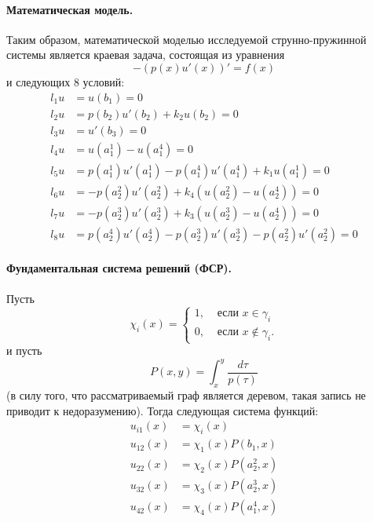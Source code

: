 \documentclass[a4paper,12pt]{article} %
\begin{document}
\paragraph{Математическая модель.}
Таким образом, математической моделью исследуемой струнно-пружинной системы является
краевая задача, состоящая из уравнения
\begin{equation}
	-(p(x)u'(x))' = f(x)
\end{equation}
и следующих 8 условий:
\begin{align}
	l_1 u & = u(b_1) = 0
	\\
	l_2 u & = p(b_2  ) u'(b_2  ) + k_2  u(b_2  ) = 0
	\\
	l_3 u & = u'(b_3) = 0
	\\
	l_4 u & = u(a_1^1) - u(a_1^4) = 0
	\\
	l_5 u & = p(a_1^1) u'(a_1^1) - p(a_1^4) u'(a_1^4) + k_1  u(a_1^1) = 0
	\\
	l_6 u & = - p(a_2^2) u'(a_2^2) + k_4 (u(a_2^2) - u(a_2^4)) = 0
	\\
	l_7 u & = - p(a_2^3) u'(a_2^3) + k_3 (u(a_2^3) - u(a_2^4)) = 0
	\\
	l_8 u & = p(a_2^4) u'(a_2^4) - p(a_2^3) u'(a_2^3) - p(a_2^2) u'(a_2^2) = 0
\end{align}

\paragraph{Фундаментальная система решений (ФСР).}
Пусть
\begin{equation}
	\chi_{i}(x) = \begin{cases}
		1, & \mbox{~если~} x \in \gamma_i
		\\
		0, & \mbox{~если~} x \notin \gamma_i.
	\end{cases}
\end{equation}
и пусть
\begin{equation}
	P(x,y) = \int_x^y \frac{d\tau}{p(\tau)}
\end{equation}
(в силу того, что рассматриваемый граф является деревом, такая запись не приводит к недоразумению).
Тогда следующая система функций:
\begin{align}
	u_{i1}(x) & = \chi_i(x)
	\\
	u_{12}(x) & = \chi_1(x) P(b_1  , x)
	\\
	u_{22}(x) & = \chi_2(x) P(a_2^2, x)
	\\
	u_{32}(x) & = \chi_3(x) P(a_2^3, x)
	\\
	u_{42}(x) & = \chi_4(x) P(a_1^4, x)
\end{align}
\end{document}
